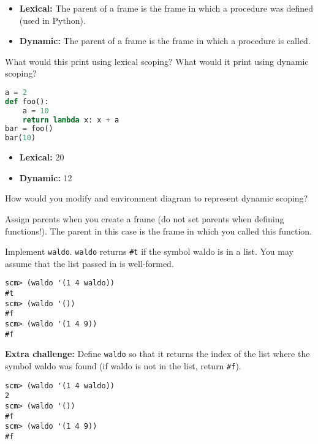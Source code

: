 \documentclass{exam}
\begin{document}
\begin{questions}
\begin{blocksection}
\begin{solution}[0.5in]
\begin{itemize}
    \item \textbf{Lexical:} The parent of a frame is the frame in which a
        procedure was defined (used in Python).
    \item \textbf{Dynamic:} The parent of a frame is the frame in which a
        procedure is called.
\end{itemize}
\end{solution}
\end{blocksection}

\begin{blocksection}
\question What would this print using lexical scoping? What would it print using
dynamic scoping?

\begin{lstlisting}[language=Python]
a = 2
def foo():
    a = 10
    return lambda x: x + a
bar = foo()
bar(10)
\end{lstlisting}
\begin{solution}[0.25in]
\begin{itemize}
    \item \textbf{Lexical:} 20
    \item \textbf{Dynamic:} 12
\end{itemize}
\end{solution}

\end{blocksection}

\begin{blocksection}
\question How would you modify and environment diagram to represent dynamic
scoping?

\begin{solution}[0.5in]
Assign parents when you create a frame (do not set parents when defining
functions!). The parent in this case is the frame in which you called this
function.
\end{solution}

\end{blocksection}

\begin{blocksection}
\question Implement \texttt{waldo}. \texttt{waldo} returns \texttt{\#t} if the
symbol waldo is in a list. You may assume that the list passed in is
well-formed.\\

\begin{lstlisting}
scm> (waldo '(1 4 waldo))
#t
scm> (waldo '())
#f
scm> (waldo '(1 4 9))
#f
\end{lstlisting}
\textbf{Extra challenge:} Define \texttt{waldo} so that it returns the index of
the list where the symbol waldo was found (if waldo is not in the list, return
\texttt{\#f}).
\begin{lstlisting}
scm> (waldo '(1 4 waldo))
2
scm> (waldo '())
#f
scm> (waldo '(1 4 9))
#f
\end{lstlisting}


\end{blocksection}
\end{questions}
\end{document}
